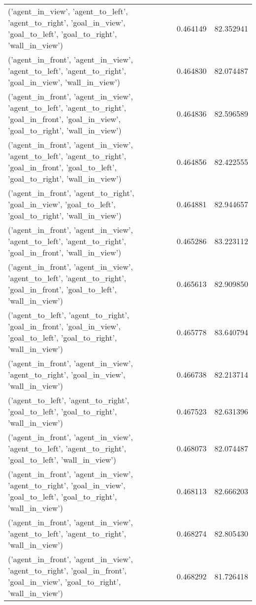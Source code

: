 \begin{tabular}{lrr}
('agent\_in\_view', 'agent\_to\_left', 'agent\_to\_right', 'goal\_in\_view', 'goal\_to\_left', 'goal\_to\_right', 'wall\_in\_view') & 0.464149 & 82.352941 \\
('agent\_in\_front', 'agent\_in\_view', 'agent\_to\_left', 'agent\_to\_right', 'goal\_in\_view', 'wall\_in\_view') & 0.464830 & 82.074487 \\
('agent\_in\_front', 'agent\_in\_view', 'agent\_to\_left', 'agent\_to\_right', 'goal\_in\_front', 'goal\_in\_view', 'goal\_to\_right', 'wall\_in\_view') & 0.464836 & 82.596589 \\
('agent\_in\_front', 'agent\_in\_view', 'agent\_to\_left', 'agent\_to\_right', 'goal\_in\_front', 'goal\_to\_left', 'goal\_to\_right', 'wall\_in\_view') & 0.464856 & 82.422555 \\
('agent\_in\_front', 'agent\_to\_right', 'goal\_in\_view', 'goal\_to\_left', 'goal\_to\_right', 'wall\_in\_view') & 0.464881 & 82.944657 \\
('agent\_in\_front', 'agent\_in\_view', 'agent\_to\_left', 'agent\_to\_right', 'goal\_in\_front', 'wall\_in\_view') & 0.465286 & 83.223112 \\
('agent\_in\_front', 'agent\_in\_view', 'agent\_to\_left', 'agent\_to\_right', 'goal\_in\_front', 'goal\_to\_left', 'wall\_in\_view') & 0.465613 & 82.909850 \\
('agent\_to\_left', 'agent\_to\_right', 'goal\_in\_front', 'goal\_in\_view', 'goal\_to\_left', 'goal\_to\_right', 'wall\_in\_view') & 0.465778 & 83.640794 \\
('agent\_in\_front', 'agent\_in\_view', 'agent\_to\_right', 'goal\_in\_view', 'wall\_in\_view') & 0.466738 & 82.213714 \\
('agent\_to\_left', 'agent\_to\_right', 'goal\_to\_left', 'goal\_to\_right', 'wall\_in\_view') & 0.467523 & 82.631396 \\
('agent\_in\_front', 'agent\_in\_view', 'agent\_to\_left', 'agent\_to\_right', 'goal\_to\_left', 'wall\_in\_view') & 0.468073 & 82.074487 \\
('agent\_in\_front', 'agent\_in\_view', 'agent\_to\_right', 'goal\_in\_view', 'goal\_to\_left', 'goal\_to\_right', 'wall\_in\_view') & 0.468113 & 82.666203 \\
('agent\_in\_front', 'agent\_in\_view', 'agent\_to\_left', 'agent\_to\_right', 'wall\_in\_view') & 0.468274 & 82.805430 \\
('agent\_in\_front', 'agent\_in\_view', 'agent\_to\_right', 'goal\_in\_front', 'goal\_in\_view', 'goal\_to\_right', 'wall\_in\_view') & 0.468292 & 81.726418 \\

\end{tabular}
